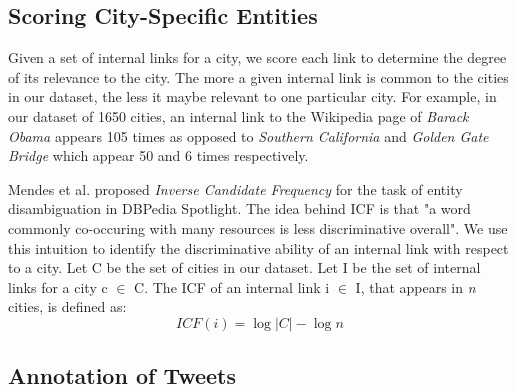 \subsection{Scoring City-Specific Entities}
Given a set of internal links for a city, we score each link to determine the degree of its relevance to the city. The more a given internal link is common to the cities in our dataset, the less it maybe relevant to one particular city. For example, in our dataset of 1650 cities, an internal link to the Wikipedia page of \textit{Barack Obama} appears 105 times as opposed to \textit{Southern California} and \textit{Golden Gate Bridge} which appear 50 and 6 times respectively. 

Mendes et al. \cite{mendes2011dbpedia} proposed \textit{Inverse Candidate Frequency} for the task of entity disambiguation in DBPedia Spotlight. The idea behind ICF is that "a word commonly co-occuring with many resources is less discriminative overall". We use this intuition to identify the discriminative ability of an internal link with respect to a city. Let C be the set of cities in our dataset. Let I be the set of internal links for a city c $\in$ C. The ICF of an internal link i $\in$ I, that appears in \textit{n} cities, is defined as:
\begin{equation}
	ICF(i) = \log |C|- \log n
\end{equation}

\subsection{Annotation of Tweets}







